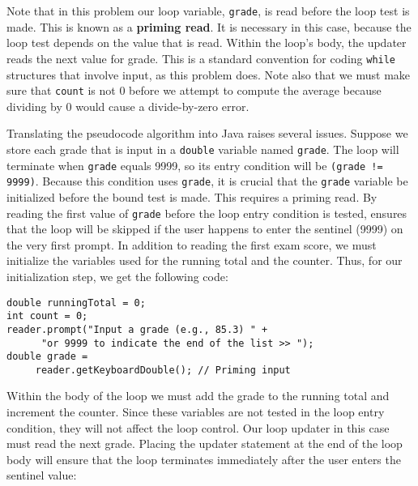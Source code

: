 \noindent Note that in this problem our loop variable, {\tt grade},
 is read before the loop test is made. This
is known as a {\bf priming read}. It is necessary in this case,
because the loop test depends on the value that is read.  Within the
loop's body, the updater reads the next value for grade. This is a
standard convention for coding {\tt while} structures that involve
input, as this problem does. Note also that we must make sure that
{\tt count} is not 0 before we attempt to compute the
average because dividing by 0 would cause a divide-by-zero error.

Translating the pseudocode algorithm into Java raises several issues.
Suppose we store each grade that is input in a {\tt double} variable
named {\tt grade}.  The loop will terminate when {\tt grade} equals
9999, so its entry condition will be {\tt (grade != 9999)}. Because
this condition uses {\tt grade}, it is crucial that the {\tt grade}
variable be initialized before the bound test is made.  This requires
a priming read. By reading the first value of {\tt grade} before the
loop entry condition is tested, ensures that the loop will be skipped
if the user happens to enter the sentinel (9999) on the very first
prompt. In addition to reading the first exam score, we must
initialize the variables used for the running total and the
counter. Thus, for our initialization step, we get the following code:

\begin{jjjlisting}
\begin{lstlisting}
double runningTotal = 0;
int count = 0;
reader.prompt("Input a grade (e.g., 85.3) " +
      "or 9999 to indicate the end of the list >> ");
double grade = 
     reader.getKeyboardDouble(); // Priming input
\end{lstlisting}
\end{jjjlisting}

\noindent Within the body of the loop we must add the grade to the
running total and increment the counter. Since these variables are not
tested in the loop entry condition, they will not affect the loop
control.  Our loop updater in this case must read the next
grade. Placing the updater statement at the end of the
loop body will ensure that the loop terminates immediately after the
user enters the sentinel value:

